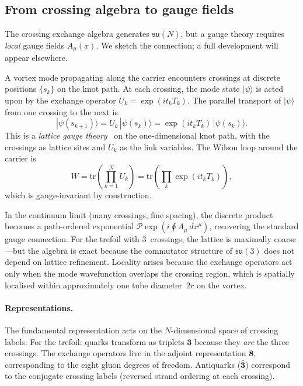 \documentclass[11pt,a4paper]{article}
\begin{document}
\subsection{From crossing algebra to gauge fields}

The crossing exchange algebra generates $\mathfrak{su}(N)$, but
a gauge theory requires \emph{local} gauge fields $A_\mu(x)$.
We sketch the connection; a full development will appear
elsewhere.

A vortex mode propagating along the carrier encounters crossings
at discrete positions $\{s_k\}$ on the knot path.  At each
crossing, the mode state $|\psi\rangle$ is acted upon by the
exchange operator $U_k = \exp(it_k T_k)$.  The parallel transport
of $|\psi\rangle$ from one crossing to the next is
\begin{equation}
  |\psi(s_{k+1})\rangle = U_k\,|\psi(s_k)\rangle
    = \exp(it_k T_k)\,|\psi(s_k)\rangle.
  \label{eq:transport}
\end{equation}
This is a \emph{lattice gauge theory}~\cite{Wilson1974} on the
one-dimensional knot path, with the crossings as lattice sites
and $U_k$ as the link variables.  The Wilson loop around the
carrier is
\begin{equation}
  W = \mathrm{tr}\!\left(\prod_{k=1}^{N} U_k\right)
    = \mathrm{tr}\!\left(\prod_k \exp(it_k T_k)\right),
  \label{eq:Wilson}
\end{equation}
which is gauge-invariant by construction.

In the continuum limit (many crossings, fine spacing), the
discrete product becomes a path-ordered exponential
$\mathcal{P}\exp(i\oint A_\mu\,dx^\mu)$, recovering the
standard gauge connection.  For the trefoil with 3~crossings,
the lattice is maximally coarse---but the algebra is exact
because the commutator structure of $\mathfrak{su}(3)$ does
not depend on lattice refinement.  Locality arises because the
exchange operators act only when the mode wavefunction overlaps
the crossing region, which is spatially localised within
approximately one tube diameter~$2r$ on the vortex.

\paragraph{Representations.}
The fundamental representation acts on the $N$-dimensional
space of crossing labels.  For the trefoil: quarks transform as
triplets $\mathbf{3}$ because they \emph{are} the three crossings.
The exchange operators live in the adjoint representation
$\mathbf{8}$, corresponding to the eight gluon degrees of freedom.
Antiquarks ($\bar{\mathbf{3}}$) correspond to the conjugate
crossing labels (reversed strand ordering at each crossing).
\end{document}
